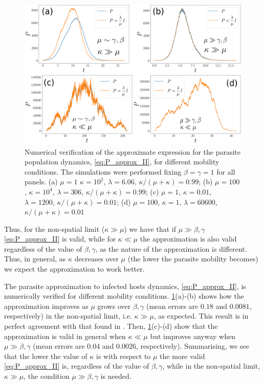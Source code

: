 \begin{figure}[H]
    \centering
    \includegraphics[width=\columnwidth]{Figures/P_approx.png}
    \caption[Validation of the approximate expression for the parasite
        population dynamics]{Numerical verification of the approximate
        expression for the parasite population dynamics, \cref{eq:P_approx_II},
        for different mobility conditions. The simulations were performed
        fixing $\beta=\gamma=1$ for all panels. (a) $\mu=1$ $\kappa=10^2$,
        $\lambda=6.06$, $\kappa/(\mu+\kappa)=0.99$;
        (b) $\mu=100$, $\kappa=10^4$, $\lambda=306$,
        $\kappa/(\mu+\kappa)=0.99$; (c)
        $\mu=1$, $\kappa=0.01$, $\lambda=1200$, $\kappa/(\mu+\kappa)=0.01$; (d)
        $\mu=100$, $\kappa=1$, $\lambda=60600$,  $\kappa/(\mu+\kappa)=0.01$}
    \label{fig:P_approx}
\end{figure}

Thus, for the non-spatial limit ($\kappa\gg\mu$) we have that if
$\mu\gg\beta,\gamma$ \cref{eq:P_approx_II} is valid, while for $\kappa\ll\mu$
the
approximation is also valid regardless of the value of $\beta,\gamma$, as the
nature of the approximation is different. Thus, in general, as $\kappa$
decreases over $\mu$ (the lower the parasite mobility becomes) we expect the
approximation to work better.

The parasite approximation to infected hosts dynamics, \cref{eq:P_approx_II},
is numerically verified for different mobility conditions.
\cref{fig:P_approx}(a)-(b) shows how the approximation improves as $\mu$ grows
over $\beta,\gamma$ (mean errors are $0.18$ and $0.0081$, respectively) in the
non-spatial limit, i.e. $\kappa\gg\mu$, as expected. This result is in perfect
agreement with that found in \cite{GimenezRomero2021}. Then,
\cref{fig:P_approx}(c)-(d) show that the approximation is valid in general when
$\kappa\ll\mu$ but improves anyway when $\mu\gg\beta,\gamma$ (mean errors are
0.04 and 0.0026, respectively). Summarising, we see that the lower the value of
$\kappa$ is with respect to $\mu$ the more valid \cref{eq:P_approx_II} is,
regardless of the value of $\beta,\gamma$, while in the non-spatial limit,
$\kappa\gg\mu$, the condition $\mu\gg\beta,\gamma$ is needed.

